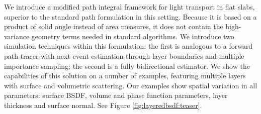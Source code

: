 We introduce a modified path integral framework for light transport in flat slabs, superior to the standard path formulation in this setting. Because it is based on a product of solid angle instead of area measures, it does not contain the high-variance geometry terms needed in standard algorithms. We introduce two simulation techniques within this formulation: the first is analogous to a forward path tracer with next event estimation through layer boundaries and multiple importance sampling; the second is a fully bidirectional estimator. We show the capabilities of this solution on a number of examples, featuring multiple layers with surface and volumetric scattering. Our examples show spatial variation in all parameters: surface BSDF, volume and phase function parameters, layer thickness and surface normal. See Figure \ref{fig:layeredbsdf:teaser}.

